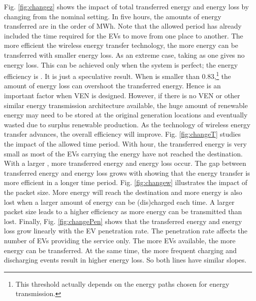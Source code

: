 \documentclass[journal]{IEEEtran}
\begin{document}
Fig. \ref{fig:changez} shows the impact of total transferred energy and energy loss by changing  from the nominal setting. In five hours, the amounts of energy transferred are in the order of MWh. Note that the allowed period has already included the time required for the EVs to move from one place to another. The more efficient the wireless energy transfer technology, the more energy can be transferred with smaller energy loss.
As an extreme case, taking  as one gives no energy loss. This can be achieved only when the system is perfect; the energy efficiency is . It is just a speculative result.
When  is smaller than 0.83,\footnote{This threshold actually depends on the energy paths chosen for energy transmission.} the amount of energy loss can overshoot the transferred energy. Hence  is an important factor when VEN is designed. However, if there is no VEN or other similar energy transmission architecture available, the huge amount of renewable energy may need to be stored at the original generation locations and eventually wasted due to surplus renewable production. As the technology of wireless energy transfer advances, the overall efficiency will improve.
Fig. \ref{fig:changeT} studies the impact of the allowed time period. With  hour, the transferred energy is very small as most of the EVs carrying the energy have not  reached the destination. With a larger , more transferred energy and energy loss occur. The gap between transferred energy and energy loss grows with  showing that the energy transfer is more efficient in a longer time period.
Fig. \ref{fig:changew} illustrates the impact of the packet size. More energy will reach the destination and more energy is  also lost when a larger amount of energy can be (dis)charged each time. A larger packet size leads to a higher efficiency as more energy can be transmitted than  lost. 
Finally, Fig. \ref{fig:changePen} shows that the transferred energy and energy loss grow linearly with the EV penetration rate. The penetration rate affects the number of EVs providing the service only. The more EVs available, the more energy can be transferred. At the same time, the more frequent charging and discharging events result in higher energy loss. So both lines have similar slopes.
\end{document}
